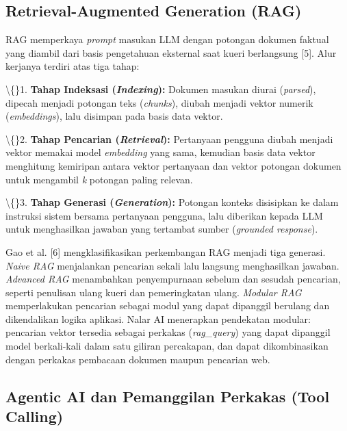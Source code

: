 \documentclass[12pt,a4paper]{article}
\begin{document}
\subsection*{Retrieval-Augmented Generation (RAG)}

RAG memperkaya \textit{prompt} masukan LLM dengan potongan dokumen faktual yang diambil dari basis pengetahuan eksternal saat kueri berlangsung {[}5{]}. Alur kerjanya terdiri atas tiga tahap:



\textbackslash\{\}1. \textbf{Tahap Indeksasi (}\textbf{\textit{Indexing}\textbf{}):} Dokumen masukan diurai (\textit{parsed}), dipecah menjadi potongan teks (\textit{chunks}), diubah menjadi vektor numerik (\textit{embeddings}), lalu disimpan pada basis data vektor.



\textbackslash\{\}2. \textbf{Tahap Pencarian (}\textbf{\textit{Retrieval}\textbf{}):} Pertanyaan pengguna diubah menjadi vektor memakai model \textit{embedding} yang sama, kemudian basis data vektor menghitung kemiripan antara vektor pertanyaan dan vektor potongan dokumen untuk mengambil \textit{k} potongan paling relevan.



\textbackslash\{\}3. \textbf{Tahap Generasi (}\textbf{\textit{Generation}\textbf{}):} Potongan konteks disisipkan ke dalam instruksi sistem bersama pertanyaan pengguna, lalu diberikan kepada LLM untuk menghasilkan jawaban yang tertambat sumber (\textit{grounded response}).



Gao et al. {[}6{]} mengklasifikasikan perkembangan RAG menjadi tiga generasi. \textit{Naive RAG} menjalankan pencarian sekali lalu langsung menghasilkan jawaban. \textit{Advanced RAG} menambahkan penyempurnaan sebelum dan sesudah pencarian, seperti penulisan ulang kueri dan pemeringkatan ulang. \textit{Modular RAG} memperlakukan pencarian sebagai modul yang dapat dipanggil berulang dan dikendalikan logika aplikasi. Nalar AI menerapkan pendekatan modular: pencarian vektor tersedia sebagai perkakas (\textit{rag\_query}) yang dapat dipanggil model berkali-kali dalam satu giliran percakapan, dan dapat dikombinasikan dengan perkakas pembacaan dokumen maupun pencarian web.



\subsection*{Agentic AI dan Pemanggilan Perkakas (Tool Calling)}
\end{document}
